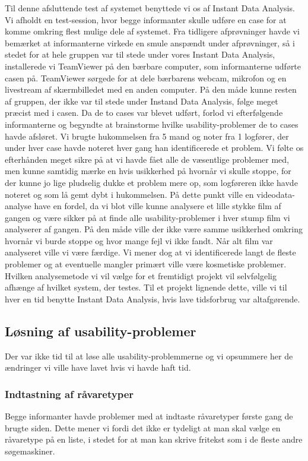 Til denne afsluttende test af systemet benyttede vi os af Instant Data Analysis. Vi afholdt en test-session, hvor begge informanter skulle udføre en case for at komme omkring flest mulige dele af systemet. Fra tidligere afprøvninger havde vi bemærket at informanterne virkede en smule anspændt under afprøvninger, så i stedet for at hele gruppen var til stede under vores Instant Data Analysis, installerede vi TeamViewer på den bærbare computer, som informanterne udførte casen på. TeamViewer sørgede for at dele bærbarens webcam, mikrofon og en livestream af skærmbilledet med en anden computer. På den måde kunne resten af gruppen, der ikke var til stede under Instand Data Analysis, følge meget præcist med i casen.
Da de to cases var blevet udført, forlod vi efterfølgende informanterne og begyndte at brainstorme hvilke usability-problemer de to cases havde afsløret. Vi brugte hukommelsen fra 5 mand og noter fra 1 logfører, der under hver case havde noteret hver gang han identificerede et problem. Vi følte os efterhånden meget sikre på at vi havde fået alle de væsentlige problemer med, men kunne samtidig mærke en hvis usikkerhed på hvornår vi skulle stoppe, for der kunne jo lige pludselig dukke et problem mere op, som logføreren ikke havde noteret og som lå gemt dybt i hukommelsen. På dette punkt ville en videodata-analyse have en fordel, da vi blot ville kunne analysere et lille stykke film af gangen og være sikker på at finde alle usability-problemer i hver stump film vi analyserer af gangen. På den måde ville der ikke være samme usikkerhed omkring hvornår vi burde stoppe og hvor mange fejl vi ikke fandt. Når alt film var analyseret ville vi være færdige. Vi mener dog at vi identificerede langt de fleste problemer og at eventuelle mangler primært ville være kosmetiske problemer. Hvilken analysemetode vi vil vælge for et fremtidigt projekt vil selvfølgelig afhænge af hvilket system, der testes. Til et projekt lignende dette, ville vi til hver en tid benytte Instant Data Analysis, hvis lave tidsforbrug var altafgørende.

\subsection{Løsning af usability-problemer}
Der var ikke tid til at løse alle usability-problemmerne og vi opsummere her de ændringer vi ville have lavet hvis vi havde haft tid.

\subsubsection{Indtastning af råvaretyper}
Begge informanter havde problemer med at indtaste råvaretyper første gang de brugte siden.
Dette mener vi fordi det ikke er tydeligt at man skal vælge en råvaretype på en liste, i stedet for at man kan skrive fritekst som i de fleste andre søgemaskiner.


